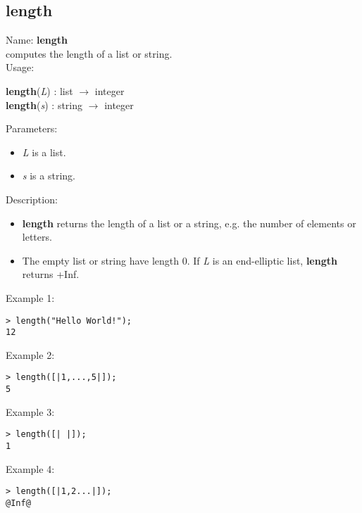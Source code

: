 \subsection{length}
\label{lablength}
\noindent Name: \textbf{length}\\
computes the length of a list or string.\\

\noindent Usage: 
\begin{center}
\textbf{length}(\emph{L}) : \textsf{list} $\rightarrow$ \textsf{integer}\\
\textbf{length}(\emph{s}) : \textsf{string} $\rightarrow$ \textsf{integer}\\
\end{center}
Parameters: 
\begin{itemize}
\item \emph{L} is a list.
\item \emph{s} is a string.
\end{itemize}
\noindent Description: \begin{itemize}

\item \textbf{length} returns the length of a list or a string, e.g. the number of elements
   or letters.

\item The empty list or string have length 0.
   If \emph{L} is an end-elliptic list, \textbf{length} returns +Inf.
\end{itemize}
\noindent Example 1: 
\begin{center}\begin{minipage}{15cm}\begin{Verbatim}[frame=single]
> length("Hello World!");
12
\end{Verbatim}
\end{minipage}\end{center}
\noindent Example 2: 
\begin{center}\begin{minipage}{15cm}\begin{Verbatim}[frame=single]
> length([|1,...,5|]);
5
\end{Verbatim}
\end{minipage}\end{center}
\noindent Example 3: 
\begin{center}\begin{minipage}{15cm}\begin{Verbatim}[frame=single]
> length([| |]);
1
\end{Verbatim}
\end{minipage}\end{center}
\noindent Example 4: 
\begin{center}\begin{minipage}{15cm}\begin{Verbatim}[frame=single]
> length([|1,2...|]);
@Inf@
\end{Verbatim}
\end{minipage}\end{center}
